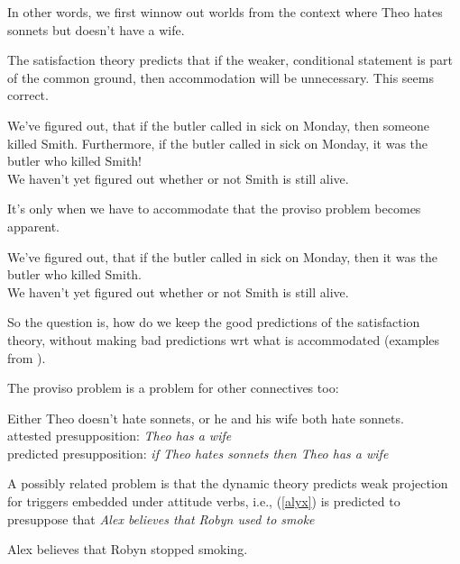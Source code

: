 \documentclass[nols,twoside,nofonts,nobib,nohyper]{tufte-handout}
\begin{document}
In other words, we first winnow out worlds from the context where Theo hates sonnets but doesn't have a wife.

  The satisfaction theory predicts that if the weaker, conditional statement is part of the common ground, then accommodation will be unnecessary. This seems correct.

  \ex
  We've figured out, that if the butler called in sick on Monday, then someone killed Smith. Furthermore, if the butler called in sick on Monday, it was the butler who killed Smith!\\
  \cmark We haven't yet figured out whether or not Smith is still alive.
  \xe

  It's only when we have to accommodate that the proviso problem becomes apparent.

  \ex
  We've figured out, that if the butler called in sick on Monday, then it was the butler who killed Smith.\\
  \xmark We haven't yet figured out whether or not Smith is still alive.
  \xe

  So the question is, how do we keep the good predictions of the satisfaction theory, without making bad predictions wrt what is accommodated (examples from \citealt{mandelkern2016}).

The proviso problem is a problem for other connectives too:

\ex
Either Theo doesn't hate sonnets, or he and his wife both hate sonnets.\\
attested presupposition: \textit{Theo has a wife}\\
predicted presupposition: \textit{if Theo hates sonnets then Theo has a wife}\\
\xe

A possibly related problem is that the dynamic theory predicts weak projection for triggers embedded under attitude verbs, i.e., (\ref{alyx}) is predicted to presuppose that \textit{Alex believes that Robyn used to smoke}

\ex\label{alyx}Alex believes that Robyn stopped smoking.
\xe
\end{document}

